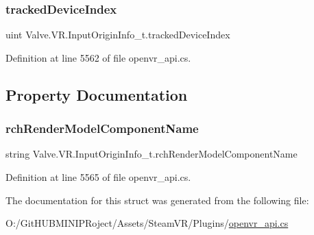 \subsubsection{\texorpdfstring{trackedDeviceIndex}{trackedDeviceIndex}}
{\footnotesize\ttfamily uint Valve.\+V\+R.\+Input\+Origin\+Info\+\_\+t.\+tracked\+Device\+Index}



Definition at line 5562 of file openvr\+\_\+api.\+cs.



\subsection{Property Documentation}
\mbox{\label{struct_valve_1_1_v_r_1_1_input_origin_info__t_a821f8c4e6eb5ff4ad25d99daa2bda844}} 
\subsubsection{\texorpdfstring{rchRenderModelComponentName}{rchRenderModelComponentName}}
{\footnotesize\ttfamily string Valve.\+V\+R.\+Input\+Origin\+Info\+\_\+t.\+rch\+Render\+Model\+Component\+Name\hspace{0.3cm}{\ttfamily [get]}}



Definition at line 5565 of file openvr\+\_\+api.\+cs.



The documentation for this struct was generated from the following file\+:\begin{DoxyCompactItemize}
\item 
O\+:/\+Git\+H\+U\+B\+M\+I\+N\+I\+P\+Roject/\+Assets/\+Steam\+V\+R/\+Plugins/\mbox{\hyperlink{openvr__api_8cs}{openvr\+\_\+api.\+cs}}\end{DoxyCompactItemize}
